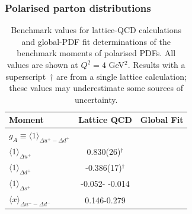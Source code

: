 \subsubsection{Polarised parton distributions}

\begin{table}[t]
\centering
\begin{tabular}{lcc}
\toprule
Moment & Lattice QCD & Global Fit\\
\midrule
$g_A\equiv\langle 1\rangle_{\Delta u^+ - \Delta d^+}$ 
&  
& \\
$\langle 1 \rangle_{\Delta u^+}$     
& 0.830(26)$^\dagger$ 
& \\
$\langle 1 \rangle_{\Delta d^+}$     
& -0.386(17)$^\dagger$ 
& \\
$\langle 1 \rangle_{\Delta s^+}$     
& -0.052- -0.014
& \\
$\langle x\rangle_{\Delta u^- - \Delta d^-}$       
& 0.146-0.279 
& \\
\bottomrule
\end{tabular}
\caption{\small Benchmark values for lattice-QCD calculations and global-PDF 
fit determinations of the benchmark moments of polarised PDFs.
%
All values are shown at $Q^2=4$ GeV$^2$.
%
Results with a superscript~$\dagger$ are from a single lattice 
calculation; these values may underestimate some sources of uncertainty.}
\label{tab:LQCDunpol}
\end{table}











